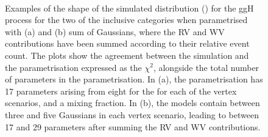 \ifNewAnalysis
\begin{figure}[htp!]
\centering
 \\
\caption{Examples of the shape of the simulated \mgg distribution (\GeV) for the ggH process for the two of the inclusive categories when parametrised with (a) \DCBpG and (b) sum of Gaussians, where the RV and WV contributions have been summed according to their relative event count. The plots show the agreement between the simulation and the parametrisation expressed as the $\chi^2$, alongside the total number of parameters in the parametrisation. In (a), the parametrisation has 17 parameters arising from eight for the \DCBpG for each of the vertex scenarios, and a mixing fraction. In (b), the models contain between three and five Gaussians in each vertex scenario, leading to between 17 and 29 parameters after summing the RV and WV contributions.}

\label{fig:model:functionalform}
\end{figure}
\else
